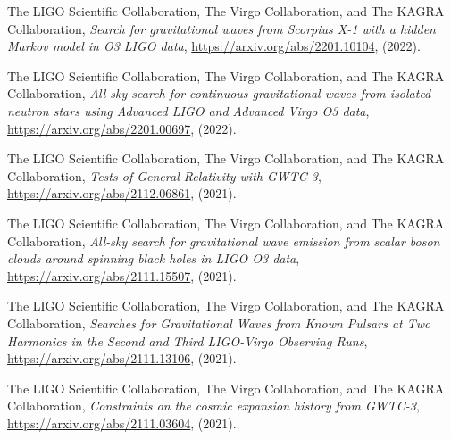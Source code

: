 \begin{etaremune}
\item The LIGO Scientific Collaboration, The Virgo Collaboration, and The KAGRA Collaboration, {\itshape Search for gravitational waves from Scorpius X-1 with a hidden Markov model in O3 LIGO data}, \href{https://arxiv.org/abs/2201.10104}{https://arxiv.org/abs/2201.10104}, (2022).
\item The LIGO Scientific Collaboration, The Virgo Collaboration, and The KAGRA Collaboration, {\itshape All-sky search for continuous gravitational waves from isolated neutron stars using Advanced LIGO and Advanced Virgo O3 data}, \href{https://arxiv.org/abs/2201.00697}{https://arxiv.org/abs/2201.00697}, (2022).
\item The LIGO Scientific Collaboration, The Virgo Collaboration, and The KAGRA Collaboration, {\itshape Tests of General Relativity with GWTC-3}, \href{https://arxiv.org/abs/2112.06861}{https://arxiv.org/abs/2112.06861}, (2021).
\item The LIGO Scientific Collaboration, The Virgo Collaboration, and The KAGRA Collaboration, {\itshape All-sky search for gravitational wave emission from scalar boson clouds around spinning black holes in LIGO O3 data}, \href{https://arxiv.org/abs/2111.15507}{https://arxiv.org/abs/2111.15507}, (2021).
\item The LIGO Scientific Collaboration, The Virgo Collaboration, and The KAGRA Collaboration, {\itshape Searches for Gravitational Waves from Known Pulsars at Two Harmonics in the Second and Third LIGO-Virgo Observing Runs}, \href{https://arxiv.org/abs/2111.13106}{https://arxiv.org/abs/2111.13106}, (2021).
\item The LIGO Scientific Collaboration, The Virgo Collaboration, and The KAGRA Collaboration, {\itshape Constraints on the cosmic expansion history from GWTC-3}, \href{https://arxiv.org/abs/2111.03604}{https://arxiv.org/abs/2111.03604}, (2021).
\end{etaremune}